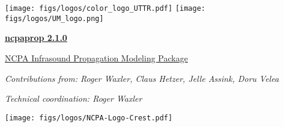 \documentclass[10pt]{article}
\newcommand{\version}{2.1.0}
\begin{document}

\vspace*{-50pt}
\texttt{[image: figs/logos/color\_logo\_UTTR.pdf]}
\hspace*{65pt}
\texttt{[image: figs/logos/UM\_logo.png]}
\vspace*{50pt}


\vspace*{0.05\textheight}

\begin{center}

\begin{Huge} \underline{\textbf{ncpaprop \version}} \end{Huge} 

\vspace*{0.025\textheight} 

\begin{Large}
\underline{NCPA Infrasound Propagation Modeling Package}
\end{Large} 

\vspace*{0.06\textheight}

\textsl{Contributions from: Roger Waxler, Claus Hetzer, Jelle Assink, Doru Velea}

\vspace*{0.02\textheight}

\textsl{Technical coordination: Roger Waxler}

\end{center}

\vspace*{0.06\textheight}

\begin{center}
\texttt{[image: figs/logos/NCPA-Logo-Crest.pdf]}
\quad
{}

\end{center}

\vfill
\newpage


\vspace*{20pt}

%
\newpage
\tableofcontents
\newpage


\newpage

\newpage

\newpage

\newpage

\newpage
%

\newpage
%
%

\newpage
%
%

\newpage


\end{document}
